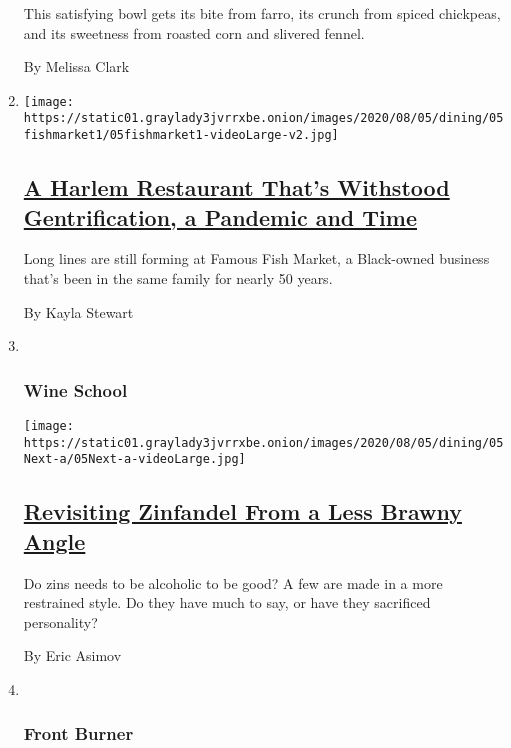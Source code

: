 \begin{enumerate}
  This satisfying bowl gets its bite from farro, its crunch from spiced
  chickpeas, and its sweetness from roasted corn and slivered fennel.

  By Melissa Clark
\item
  \texttt{[image: https://static01.graylady3jvrrxbe.onion/images/2020/08/05/dining/05fishmarket1/05fishmarket1-videoLarge-v2.jpg]}

  \hypertarget{a-harlem-restaurant-thats-withstood-gentrification-a-pandemic-and-time}{%
  \subsection{\texorpdfstring{\href{/2020/07/30/dining/famous-fish-market-harlem.html}{A
  Harlem Restaurant That's Withstood Gentrification, a Pandemic and
  Time}}{A Harlem Restaurant That's Withstood Gentrification, a Pandemic and Time}}\label{a-harlem-restaurant-thats-withstood-gentrification-a-pandemic-and-time}}

  Long lines are still forming at Famous Fish Market, a Black-owned
  business that's been in the same family for nearly 50 years.

  By Kayla Stewart
\item ~
  \hypertarget{wine-school}{%
  \subsubsection{Wine School}\label{wine-school}}

  \texttt{[image: https://static01.graylady3jvrrxbe.onion/images/2020/08/05/dining/05Next-a/05Next-a-videoLarge.jpg]}

  \hypertarget{revisiting-zinfandel-from-a-less-brawny-angle}{%
  \subsection{\texorpdfstring{\href{/2020/07/30/dining/drinks/wine-school-assignment-zinfandel.html}{Revisiting
  Zinfandel From a Less Brawny
  Angle}}{Revisiting Zinfandel From a Less Brawny Angle}}\label{revisiting-zinfandel-from-a-less-brawny-angle}}

  Do zins needs to be alcoholic to be good? A few are made in a more
  restrained style. Do they have much to say, or have they sacrificed
  personality?

  By Eric Asimov
\item ~
  \hypertarget{front-burner}{%
  \subsubsection{Front Burner}\label{front-burner}}


\end{enumerate}
